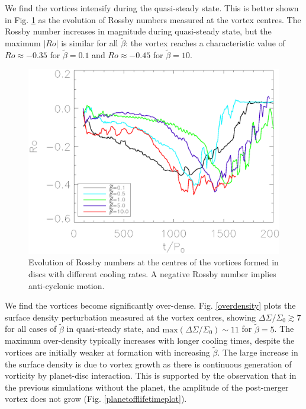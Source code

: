 We find the vortices intensify during the quasi-steady state. This is
better shown in Fig. \ref{rossbyplot} as the evolution of Rossby
numbers measured at the vortex centres.   
The Rossby number increases in magnitude during quasi-steady state,
but the maximum $|Ro|$ is similar for all $\tilde{\beta}$: the vortex
reaches a characteristic value of $Ro\approx-0.35$ for 
$\tilde\beta=0.1$ and $Ro\approx -0.45$ for $\tilde\beta=10$.    

\begin{figure}
  \includegraphics[width=\linewidth,clip=true,trim=0.5cm
  0cm 0cm 1cm]{figures/rossby}
  \caption{Evolution of Rossby numbers at the centres of the vortices
    formed in discs with different cooling rates. A negative Rossby
    number implies anti-cyclonic motion.%
    \label{rossbyplot}}    
\end{figure}

We find the vortices become significantly 
over-dense. Fig. \ref{overdensity} plots the surface density perturbation measured at the
vortex centres, showing $\Delta\Sigma/\Sigma_0 \gtrsim 7$ for all
cases of $\tilde\beta$ in quasi-steady state, and 
$\mathrm{max}(\Delta\Sigma/\Sigma_0)\sim 11$ for $\tilde\beta=5$.  
The maximum over-density typically increases with longer cooling
times, despite the vortices are initially weaker at formation with
increasing $\tilde{\beta}$. The large increase in the surface density
is due to vortex growth as there is continuous generation of vorticity by
planet-disc interaction. This is supported by the observation that in
the previous simulations without the planet, the amplitude of
the post-merger vortex does not grow (Fig. 
\ref{planetofflifetimeplot}).  

